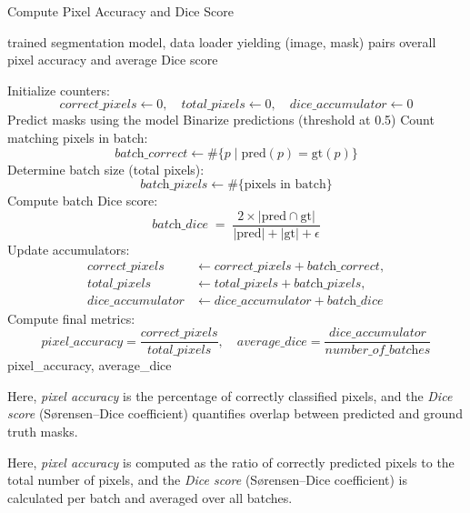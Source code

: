 \documentclass[../main.tex]{subfiles}
\begin{document}
\begin{breakablealgorithm}{Compute Pixel Accuracy and Dice Score}
\begin{algorithmic}[1]
\Require trained segmentation model, data loader yielding (image, mask) pairs
\Ensure overall pixel accuracy and average Dice score

\State Initialize counters:
\[
  \textit{correct\_pixels} \gets 0,\quad
  \textit{total\_pixels} \gets 0,\quad
  \textit{dice\_accumulator} \gets 0
\]
  \State Predict masks using the model
  \State Binarize predictions (threshold at 0.5)
  \State Count matching pixels in batch:
    \[
      \textit{batch\_correct} \gets \#\{p \mid \text{pred}(p) = \text{gt}(p)\}
    \]
  \State Determine batch size (total pixels):
    \[
      \textit{batch\_pixels} \gets \#\{\text{pixels in batch}\}
    \]
  \State Compute batch Dice score:
    \[
      \textit{batch\_dice}
      \;=\;\frac{2 \times \lvert \text{pred} \cap \text{gt}\rvert}
               {\lvert \text{pred}\rvert + \lvert \text{gt}\rvert + \epsilon}
    \]
  \State Update accumulators:
    \begin{align*}
      \textit{correct\_pixels}   &\gets \textit{correct\_pixels} + \textit{batch\_correct},\\
      \textit{total\_pixels}     &\gets \textit{total\_pixels}   + \textit{batch\_pixels},\\
      \textit{dice\_accumulator} &\gets \textit{dice\_accumulator} + \textit{batch\_dice}
    \end{align*}
\EndFor
\State Compute final metrics:
\[
  \textit{pixel\_accuracy}
  = \frac{\textit{correct\_pixels}}{\textit{total\_pixels}},\quad
  \textit{average\_dice}
  = \frac{\textit{dice\_accumulator}}{\textit{number\_of\_batches}}
\]
\Return pixel\_accuracy, average\_dice
\end{algorithmic}
\end{breakablealgorithm}

\noindent Here, \textit{pixel accuracy} is the percentage of correctly classified pixels, and the \textit{Dice score} (Sørensen--Dice coefficient) quantifies overlap between predicted and ground truth masks.

\noindent Here, \textit{pixel accuracy} is computed as the ratio of correctly predicted pixels to the total number of pixels, and the \textit{Dice score} (Sørensen--Dice coefficient) is calculated per batch and averaged over all batches.
\end{document}
